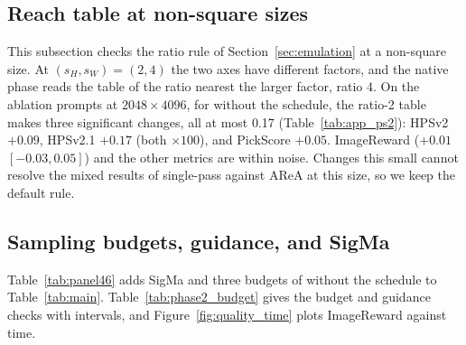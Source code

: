 
\subsection{Reach table at non-square sizes}
\label{app:ps2}

This subsection checks the ratio rule of Section~\ref{sec:emulation} at a non-square size. At $(s_H,s_W)=(2,4)$ the two axes have different factors, and the native phase reads the table of the ratio nearest the larger factor, ratio 4. On the \nabl{} ablation prompts at $2048\times4096$, for \sca{} without the schedule, the ratio-2 table makes three significant changes, all at most 0.17 (Table~\ref{tab:app_ps2}): HPSv2 $+0.09$, HPSv2.1 $+0.17$ (both $\times100$), and PickScore $+0.05$. ImageReward ($+0.01$ $[-0.03,0.05]$) and the other metrics are within noise. Changes this small cannot resolve the mixed results of single-pass \sca{} against AReA at this size, so we keep the default rule.


\subsection{Sampling budgets, guidance, and SigMa}
\label{app:budgets}

Table~\ref{tab:panel46} adds SigMa and three budgets of \sca{} without the schedule to Table~\ref{tab:main}. Table~\ref{tab:phase2_budget} gives the budget and guidance checks with intervals, and Figure~\ref{fig:quality_time} plots ImageReward against time.

\begin{table}[!htbp]
  \caption{\textbf{SigMa trails single-pass \sca{} on every metric shown; 56 steps raise the ImageReward of \sca{} without the schedule by 0.03 at twice the time.} \npanel{} prompts at $4096^2$. s: campaign mean in seconds per image on shared nodes, which every row has; IR ImageReward, HPSv2.1 $\times100$, Pick PickScore, M$_\text{c}$ MUSIQ on four $1024^2$ crops, FID$_\text{p}^\dagger$ our patch FID (Appendix~\ref{app:metricdefs}). Bold: best, underline: second within each group; shaded: ours. Colours mark each row against single-pass \sca{} at 28 steps; the budget rows use \sca{} without the schedule and are coloured against its 28-step run, which this table does not show (Table~\ref{tab:phase2_budget}). The FID cells of SigMa and single-pass \sca{} have no interval. Table~\ref{tab:main} holds the multi-stage rows. Key result: 56 steps take 139.9 against 71.5\,s per image.}
  \label{tab:panel46}
  \centering\footnotesize
\end{table}

